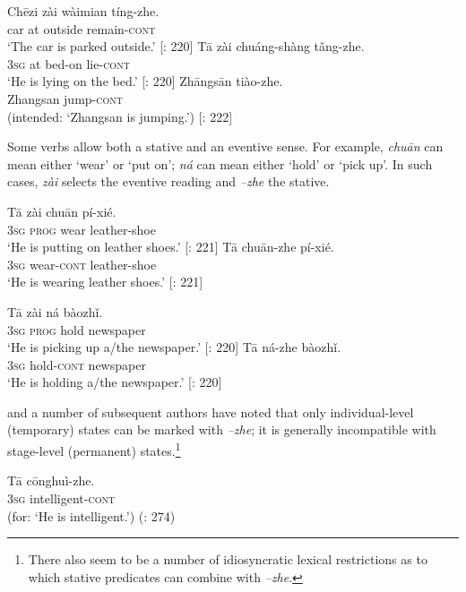\ea \label{ex:20.22}
\ea  \gll  Chēzi  zài  wàimian  tíng-zhe.\\
car  at  outside  remain-\textsc{cont} \\
\glt ‘The car is parked outside.’  [\citealt{LiThompson1981}: 220]
\ex \gll  Tā  zài  chuáng-shàng  tǎng-zhe.\\
\textsc{3sg}  at  bed-on  lie-\textsc{cont}\\
\glt ‘He is lying on the bed.’  [\citealt{LiThompson1981}: 220]
\ex \gll  *Zhāngsān  tiào-zhe.\\
  Zhangsan  jump-\textsc{cont}\\
\glt (intended: ‘Zhangsan is jumping.’)   [\citealt{LiThompson1981}: 222]
\z \z


Some verbs allow both a stative and an eventive sense. For example, \textit{chuān} can mean either ‘wear’ or ‘put on’; \textit{ná} can mean either ‘hold’ or ‘pick up’. In such cases, \textit{zài} selects the eventive reading and \textit{–zhe} the stative.


\ea \label{ex:20.23}
\ea  \gll  Tā  zài  chuān  pí-xié.\\
\textsc{3sg}  \textsc{prog}  wear  leather-shoe\\
\glt ‘He is putting on leather shoes.’  [\citealt{LiThompson1981}: 221]
\ex \gll Tā  chuān-zhe  pí-xié.\\
\textsc{3sg}  wear-\textsc{cont}  leather-shoe\\
\glt ‘He is wearing leather shoes.’  [\citealt{LiThompson1981}: 221]
\z \z

\ea \label{ex:20.24}
\ea  \gll  Tā  zài  ná  bàozhǐ.\\
\textsc{3sg}  \textsc{prog}  hold  newspaper\\
\glt ‘He is picking up a/the newspaper.’  [\citealt{LiThompson1981}: 220]
\ex \gll  Tā  ná-zhe  bàozhǐ.\\
\textsc{3sg}  hold-\textsc{cont}  newspaper\\
\glt ‘He is holding a/the newspaper.’  [\citealt{LiThompson1981}: 220]
\z \z


\citet{Yeh1993} and a number of subsequent authors have noted that only individual-level (temporary) states can be marked with \textit{–zhe}; it is generally incompatible with stage-level (permanent) states.\footnote{There also seem to be a number of idiosyncratic lexical restrictions as to which stative predicates can combine with \textit{–zhe}.}


\ea \label{ex:20.25}
\gll   *Tā  c\=onghuì-zhe.\\
  \textsc{3sg}  intelligent-\textsc{cont}  \\
\glt (for: ‘He is intelligent.’)  (\citealt{Smith1997}: 274)
\z


